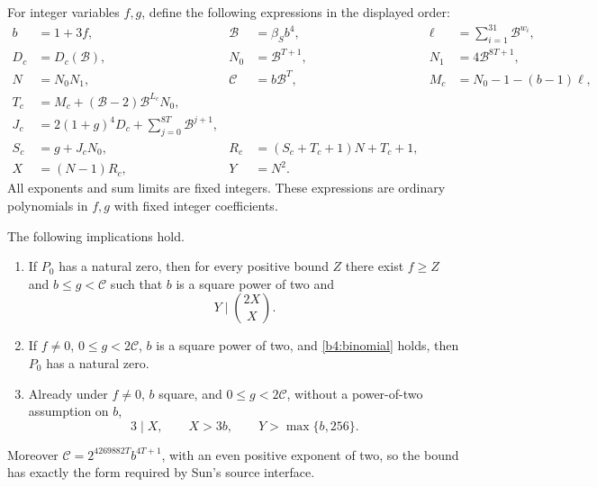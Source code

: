 For integer variables $f,g$, define the following expressions in the
displayed order:
\begin{align}
 b&=1+3f,&
 \mathcal B&=\beta_Sb^4,&
 \ell&=\sum_{i=1}^{31}\mathcal B^{w_i},
 \label{b4:source1}\\
 D_c&=D_c(\mathcal B),&
 N_0&=\mathcal B^{T+1},&
 N_1&=4\mathcal B^{8T+1},
 \label{b4:source2}\\
 N&=N_0N_1,&
 \mathscr C&=b\mathcal B^T,&
 M_c&=N_0-1-(b-1)\ell,
 \label{b4:source3}\\
 T_c&=M_c+(\mathcal B-2)\mathcal B^{L_c}N_0,
 \label{b4:source4}\\
 J_c&=2(1+g)^4D_c+\sum_{j=0}^{8T}\mathcal B^{j+1},
 \label{b4:source5}\\
 S_c&=g+J_cN_0,&
 R_c&=(S_c+T_c+1)N+T_c+1,
 \label{b4:source6}\\
 X&=(N-1)R_c,&
 Y&=N^2.
 \label{b4:source7}
\end{align}
All exponents and sum limits are fixed integers.  These expressions
are ordinary polynomials in $f,g$ with fixed integer coefficients.

\begin{theorem}
\label{b4:sourceinterface}
The following implications hold.
\begin{enumerate}
\item If $P_0$ has a natural zero, then for every positive bound $Z$
there exist $f\ge Z$ and $b\le g<\mathscr C$ such that $b$ is a
square power of two and
\[
 Y\mid\binom{2X}{X}.
 \tag{B4.7}\label{b4:binomial}
\]
\item If $f\ne0$, $0\le g<2\mathscr C$, $b$ is a square power of two,
and \eqref{b4:binomial} holds, then $P_0$ has a natural zero.
\item Already under $f\ne0$, $b$ square, and
$0\le g<2\mathscr C$, without a power-of-two assumption on $b$,
\[
 3\mid X,\qquad X>3b,\qquad Y>\max\{b,256\}.
 \tag{B4.8}\label{b4:bridgebounds}
\]
\end{enumerate}
Moreover $\mathscr C=2^{4269882T}b^{4T+1}$, with an even positive
exponent of two, so the bound has exactly the form required by
Sun's source interface.
\end{theorem}

